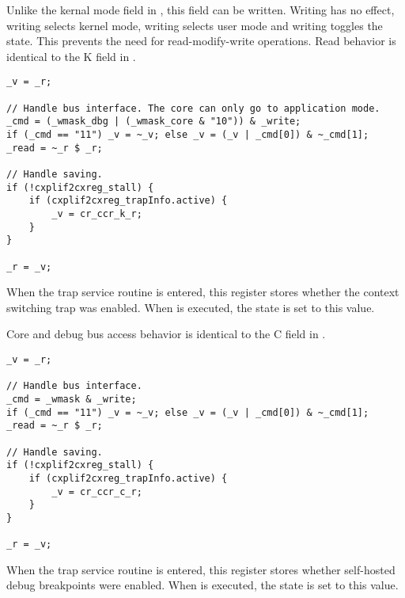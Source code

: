 Unlike the kernal mode field in , this field can be written. Writing 
 has no effect, writing  selects kernel mode, writing 
 selects user mode and writing  toggles the state. This 
prevents the need for read-modify-write operations. Read behavior is identical 
to the K field in .

\declaration{}
\implementation{}
\begin{lstlisting}
_v = _r;

// Handle bus interface. The core can only go to application mode.
_cmd = (_wmask_dbg | (_wmask_core & "10")) & _write;
if (_cmd == "11") _v = ~_v; else _v = (_v | _cmd[0]) & ~_cmd[1];
_read = ~_r $ _r;

// Handle saving.
if (!cxplif2cxreg_stall) {
    if (cxplif2cxreg_trapInfo.active) {
        _v = cr_ccr_k_r;
    }
}

_r = _v;
\end{lstlisting}

When the trap service routine is entered, this register stores whether the 
context switching trap was enabled. When  is executed, the state is 
set to this value.

Core and debug bus access behavior is identical to the C field in .

\declaration{}
\implementation{}
\begin{lstlisting}
_v = _r;

// Handle bus interface.
_cmd = _wmask & _write;
if (_cmd == "11") _v = ~_v; else _v = (_v | _cmd[0]) & ~_cmd[1];
_read = ~_r $ _r;

// Handle saving.
if (!cxplif2cxreg_stall) {
    if (cxplif2cxreg_trapInfo.active) {
        _v = cr_ccr_c_r;
    }
}

_r = _v;
\end{lstlisting}

When the trap service routine is entered, this register stores whether 
self-hosted debug breakpoints were enabled. When  is executed, the 
state is set to this value.

